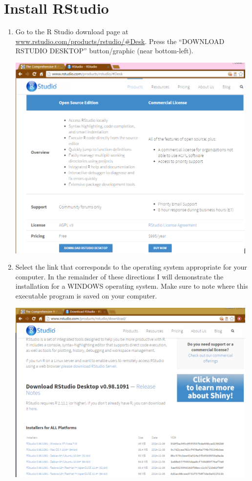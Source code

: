 \documentclass{article}\usepackage[]{graphicx}\usepackage[]{color}
\begin{document}
\section{Install RStudio}
\begin{enumerate}
  \item Go to the R Studio download page at \href{http://www.rstudio.com/products/rstudio/\#Desk}{www.rstudio.com/products/rstudio/\#Desk}.  Press the ``DOWNLOAD RSTUDIO DESKTOP'' button/graphic (near bottom-left).
\begin{center}
  \includegraphics[width=4.9in]{Figs/RStudio_Install_Home.png}
\end{center}

  \item Select the link that corresponds to the operating system appropriate for your computer.  In the remainder of these directions I will demonstrate the installation for a WINDOWS operating system.  Make sure to note where this executable program is saved on your computer.
\begin{center}
  \includegraphics[width=4.9in]{Figs/RStudio_Install_ChooseOS.png}
\end{center}


\end{enumerate}
\end{document}
